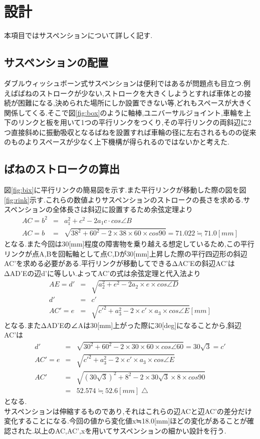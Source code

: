 \documentclass[a4paper]{jarticle}
\begin{document}
\section{設計}
本項目ではサスペンションについて詳しく記す.


\subsection{サスペンションの配置}
ダブルウィッシュボーン式サスペンションは便利ではあるが問題点も目立つ.例えばばねのストロークが少ない,ストロークを大きくしようとすれば車体との接続が困難になる,決められた場所にしか設置できない等,どれもスペースが大きく関係してくる.そこで図\ref{fig:box}のように軸棒,ユニバーサルジョイント,車輪を上下のリンクと板を用いて1つの平行リンクをつくり,その平行リンクの両斜辺に2つ直接斜めに振動吸収となるばねを設置すれば車輪の径に左右されるものの従来のものよりスペースが少なく上下機構が得られるのではないかと考えた.



\subsection{ばねのストロークの算出}
図\ref{fig:bix}に平行リンクの簡易図を示す.また平行リンクが移動した際の図を図\ref{fig:rink}示す.これらの数値よりサスペンションのストロークの長さを求める.サスペンションの全体長さは斜辺に設置するため余弦定理より
\begin{eqnarray}
   AC = b^2 & = & a_1^2+c^2-2a_1c\cdot cos∠B \\
  AC = b & = & \sqrt{38^2+60^2-2\times 38\times 60\times cos90} = 71.022 ≒　71.0 [mm]
\end{eqnarray}
となる.また今回は30[mm]程度の障害物を乗り越える想定しているため,この平行リンクが点A,Bを回転軸として点C,Dが30[mm]上昇した際の平行四辺形の斜辺AC'を求める必要がある.平行リンクが移動してできるΔAC'Eの斜辺AC'はΔAD'Eの辺d'に等しい.よってAC'の式は余弦定理と代入法より
\begin{eqnarray}
	AE = d' &= & \sqrt{a_2^2+e^2-2a_2\times e\times cos∠D} \\
	d' & = & c' \\
	AC'= e & = & \sqrt{c'^2+a_3^2-2\times c'\times a_3\times cos∠E} [mm]
\end{eqnarray}
となる.またΔAD'Eの∠Aは30[mm]上がった際に30[deg]になることから,斜辺AC'は
\begin{eqnarray}
	d' &=& \sqrt{30^2+60^2-2\times 30\times 60\times cos∠60} = 30\sqrt{3}=c' \\
	AC'= e & = & \sqrt{c'^2+a_3^2-2\times c'\times a_3\times cos∠E}  \\
	AC'& = & \sqrt{(30\sqrt{3})^2+8^2-2\times 30\sqrt{3}\times 8\times cos90} \\
	& = & 52.574 ≒ 52.6 [mm]\bigtriangleup
\end{eqnarray}
となる.　\\
サスペンションは伸縮するものであり,それはこれらの辺ACと辺AC'の差分だけ変化することになる.今回の値から変化値x≒18.0[mm]ほどの変化があることが確認された.以上のAC,AC',xを用いてサスペンションの細かい設計を行う.
\end{document}
